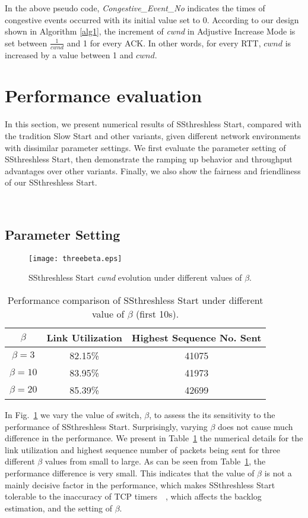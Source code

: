 \documentclass[12pt,onecolumn]{IEEEtran}
\begin{document}
In the above pseudo code, \emph{Congestive\_Event\_No} indicates the times of
congestive events occurred with its initial value set to $0$. According to our
design shown in Algorithm \ref{alg1}, the increment of \emph{cwnd} in Adjustive
Increase Mode is set between $\frac{1}{cwnd}$ and 1 for every ACK. In other
words, for every RTT, $cwnd$ is increased by a value between 1 and $cwnd$.

\section{Performance evaluation}

In this section, we present numerical results of SSthreshless Start, compared
with the tradition Slow Start and other variants, given different network
environments with dissimilar parameter settings. We first evaluate the parameter
setting of SSthreshless Start, then demonstrate the ramping up behavior and
throughput advantages over other variants. Finally, we also show the fairness
and friendliness of our SSthreshless Start.

~\subsection{Parameter Setting}

\begin{figure}
\centering
\texttt{[image: threebeta.eps]}
\caption{SSthreshless Start \emph{cwnd} evolution under different values of
$\beta$.} \label{fig_Parameter}
\end{figure}

\begin{table}
\centering
\caption{\footnotesize Performance comparison of SSthreshless Start under different value of $\beta$  (first 10s).} \begin{tabular}{|c|c|c|} \hline
$\beta$ & Link Utilization & Highest Sequence No. Sent \\ \hline \hline
$\beta= 3$ & 82.15\% & 41075 \\ \hline $\beta=10$ & 83.95\% & 41973   \\ \hline
$\beta=20$ & 85.39\% & 42699  \\ \hline
\end{tabular}
\label{tableparameter}
\end{table}




In Fig.~\ref{fig_Parameter} we vary the value of switch, $\beta$, to assess the
its sensitivity to the performance of SSthreshless Start. Surprisingly, varying
$\beta$ does not cause much difference in the performance. We present in
Table~\ref{tableparameter} the numerical details for the link utilization and
highest sequence number of packets being sent for three different $\beta$
values from small to large. As can be seen from Table~\ref{tableparameter}, the
performance difference is very small. This indicates that the value of $\beta$
is not a mainly decisive factor in the performance, which makes SSthreshless
Start tolerable to the inaccuracy of TCP
timers~\cite{timer1}~\cite{timer2}, which affects the backlog
estimation, and the setting of $\beta$.
\end{document}
